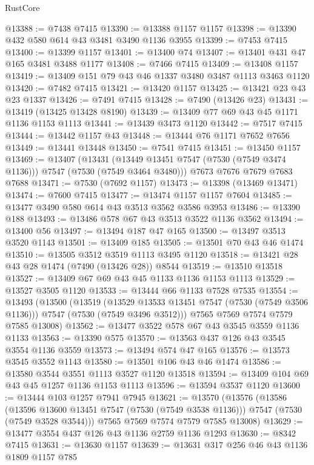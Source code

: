 \begin{lexlean}{RustCore}
\begin{coremodule}
@13388 := @7438 @7415
@13390 := @13388 @1157 @1157
@13398 := @13390 @432 @580 @614 @43 @3481 @3490 @1136 @3955
@13399 := @7453 @7415
@13400 := @13399 @1157
@13401 := @13400 @74
@13407 := @13401 @431 @47 @165 @3481 @3488 @1177
@13408 := @7466 @7415
@13409 := @13408 @1157
@13419 := @13409 @151 @79 @43 @46 @1337 @3480 @3487 @1113 @3463 @1120
@13420 := @7482 @7415
@13421 := @13420 @1157
@13425 := @13421 @23 @43 @23 @1337
@13426 := @7491 @7415
@13428 := @7490 (@13426 @23)
@13431 := @13419 (@13425 @13428 @8190)
@13439 := @13409 @77 @69 @43 @45 @1171 @1136 @1153 @1113
@13441 := @13439 @3473 @1120
@13442 := @7517 @7415
@13444 := @13442 @1157 @43
@13448 := @13444 @76 @1171 @7652 @7656
@13449 := @13441 @13448
@13450 := @7541 @7415
@13451 := @13450 @1157
@13469 := @13407
    (@13431 (@13449 @13451 @7547 (@7530 (@7549 @3474 @1136))) @7547 (@7530 (@7549 @3464 @3480)))
    @7673
    @7676
    @7679
    @7683
    @7688
@13471 := @7530 (@7692 @1157)
@13473 := @13398 (@13469 @13471)
@13474 := @7600 @7415
@13477 := @13474 @1157 @1157 @7604
@13485 := @13477 @3490 @580 @614 @43 @3513 @3562 @3586 @3953
@13486 := @13390 @188
@13493 := @13486 @578 @67 @43 @3513 @3522 @1136 @3562
@13494 := @13400 @56
@13497 := @13494 @187 @47 @165
@13500 := @13497 @3513 @3520 @1143
@13501 := @13409 @185
@13505 := @13501 @70 @43 @46 @1474
@13510 := @13505 @3512 @3519 @1113 @3495 @1120
@13518 := @13421 @28 @43 @28 @1474 (@7490 (@13426 @28)) @8544
@13519 := @13510 @13518
@13527 := @13409 @67 @69 @43 @45 @1133 @1136 @1153 @1113
@13529 := @13527 @3505 @1120
@13533 := @13444 @66 @1133 @7528 @7535
@13554 := @13493
    (@13500
      (@13519
        (@13529 @13533 @13451 @7547 (@7530 (@7549 @3506 @1136)))
        @7547
        (@7530 (@7549 @3496 @3512)))
      @7565
      @7569
      @7574
      @7579
      @7585
      @13008)
@13562 := @13477 @3522 @578 @67 @43 @3545 @3559 @1136 @1133
@13563 := @13390 @575
@13570 := @13563 @437 @126 @43 @3545 @3554 @1136 @3559
@13573 := @13494 @574 @47 @165
@13576 := @13573 @3545 @3552 @1143
@13580 := @13501 @106 @43 @46 @1474
@13586 := @13580 @3544 @3551 @1113 @3527 @1120 @13518
@13594 := @13409 @104 @69 @43 @45 @1257 @1136 @1153 @1113
@13596 := @13594 @3537 @1120
@13600 := @13444 @103 @1257 @7941 @7945
@13621 := @13570
    (@13576
      (@13586
        (@13596 @13600 @13451 @7547 (@7530 (@7549 @3538 @1136)))
        @7547
        (@7530 (@7549 @3528 @3544)))
      @7565
      @7569
      @7574
      @7579
      @7585
      @13008)
@13629 := @13477 @3554 @437 @126 @43 @1136 @2759 @1136 @1293
@13630 := @8342 @7415
@13631 := @13630 @1157
@13639 := @13631 @317 @256 @46 @43 @1136 @1809 @1157 @785

\end{coremodule}
\end{lexlean}
